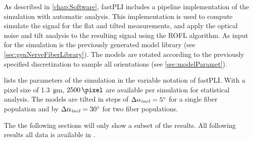 %
As described in \cref{chap:Software}, \ac{fastPLI} includes a pipeline implementation of the simulation with automatic analysis.
This implementation is used to compute simulate the signal for the flat and tilted measurements, and apply the optical noise and tilt analysis to the resulting signal using the \ac{ROFL} algorithm. 
As input for the simulation is the previously generated model library (see \cref{sec:genNerveFiberLibrary}).
The models are rotated according to the previously specified discretization to sample all orientations (see \cref{sec:modelParamet}).
\par
% 
 lists the parameters of the simulation in the variable notation of \ac{fastPLI}.
With a pixel size of \SI{1.3}{\micro\meter}, $\SI{2500}{\pixel}$ are available per simulation for statistical analysis.
The models are tilted in steps of $\Delta \textnormal{$\alpha_{\mathit{incl}}$} = \SI{5}{\degree}$ for a single fiber population and by $\Delta \textnormal{$\alpha_{\mathit{incl}}$} = \SI{30}{\degree}$ for two fiber populations.
\par
% 
The the following sections will only show a subset of the results. 
All following results all data is available in \dummy{}.
% 
% 
%
